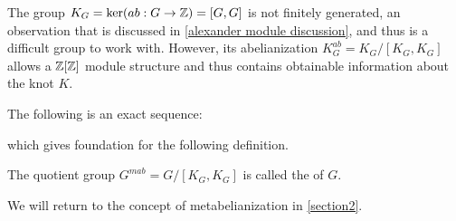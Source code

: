 The group $K_G=\ker(ab:G\to\operatorname{\mathbb{Z}})=[G, G]$ is not finitely generated, an observation that is discussed in \cref{alexander module discussion}, and thus is a difficult group to work with. However, its abelianization $K_G^{ab}=K_G/[K_G, K_G]$ allows a $\operatorname{\mathbb{Z}}[\operatorname{\mathbb{Z}}]$ module structure and thus contains obtainable information about the knot $K$. 

The following is an exact sequence:
\begin{center}
\end{center}
which gives foundation for the following definition.


\begin{definition}[metabelianization]\label{def:metabelianization}
  The quotient group $G^{mab}=G/[K_G, K_G]$ is called the  of $G$. 
\end{definition}

We will return to the concept of metabelianization in \cref{section2}.




